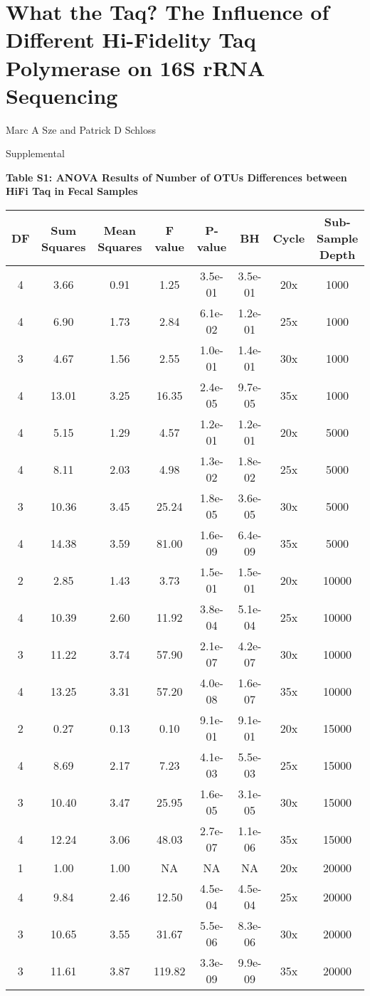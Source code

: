\documentclass[12pt,]{article}
\title{}
\author{}
\date{}
\begin{document}
\section{What the Taq? The Influence of Different Hi-Fidelity Taq
Polymerase on 16S rRNA
Sequencing}\label{what-the-taq-the-influence-of-different-hi-fidelity-taq-polymerase-on-16s-rrna-sequencing}

\vspace{10mm}

\begin{center}
Marc A Sze and Patrick D Schloss

\vspace{10mm}

Supplemental
\end{center}

\newpage

\textbf{Table S1: ANOVA Results of Number of OTUs Differences between
HiFi Taq in Fecal Samples}

\begin{longtable}[]{@{}cccccccc@{}}
\toprule
DF & Sum Squares & Mean Squares & F value & P-value & BH & Cycle &
Sub-Sample Depth\tabularnewline
\midrule
\endhead
4 & 3.66 & 0.91 & 1.25 & 3.5e-01 & 3.5e-01 & 20x & 1000\tabularnewline
4 & 6.90 & 1.73 & 2.84 & 6.1e-02 & 1.2e-01 & 25x & 1000\tabularnewline
3 & 4.67 & 1.56 & 2.55 & 1.0e-01 & 1.4e-01 & 30x & 1000\tabularnewline
4 & 13.01 & 3.25 & 16.35 & 2.4e-05 & 9.7e-05 & 35x & 1000\tabularnewline
4 & 5.15 & 1.29 & 4.57 & 1.2e-01 & 1.2e-01 & 20x & 5000\tabularnewline
4 & 8.11 & 2.03 & 4.98 & 1.3e-02 & 1.8e-02 & 25x & 5000\tabularnewline
3 & 10.36 & 3.45 & 25.24 & 1.8e-05 & 3.6e-05 & 30x & 5000\tabularnewline
4 & 14.38 & 3.59 & 81.00 & 1.6e-09 & 6.4e-09 & 35x & 5000\tabularnewline
2 & 2.85 & 1.43 & 3.73 & 1.5e-01 & 1.5e-01 & 20x & 10000\tabularnewline
4 & 10.39 & 2.60 & 11.92 & 3.8e-04 & 5.1e-04 & 25x &
10000\tabularnewline
3 & 11.22 & 3.74 & 57.90 & 2.1e-07 & 4.2e-07 & 30x &
10000\tabularnewline
4 & 13.25 & 3.31 & 57.20 & 4.0e-08 & 1.6e-07 & 35x &
10000\tabularnewline
2 & 0.27 & 0.13 & 0.10 & 9.1e-01 & 9.1e-01 & 20x & 15000\tabularnewline
4 & 8.69 & 2.17 & 7.23 & 4.1e-03 & 5.5e-03 & 25x & 15000\tabularnewline
3 & 10.40 & 3.47 & 25.95 & 1.6e-05 & 3.1e-05 & 30x &
15000\tabularnewline
4 & 12.24 & 3.06 & 48.03 & 2.7e-07 & 1.1e-06 & 35x &
15000\tabularnewline
1 & 1.00 & 1.00 & NA & NA & NA & 20x & 20000\tabularnewline
4 & 9.84 & 2.46 & 12.50 & 4.5e-04 & 4.5e-04 & 25x & 20000\tabularnewline
3 & 10.65 & 3.55 & 31.67 & 5.5e-06 & 8.3e-06 & 30x &
20000\tabularnewline
3 & 11.61 & 3.87 & 119.82 & 3.3e-09 & 9.9e-09 & 35x &
20000\tabularnewline
\bottomrule
\end{longtable}
\end{document}
